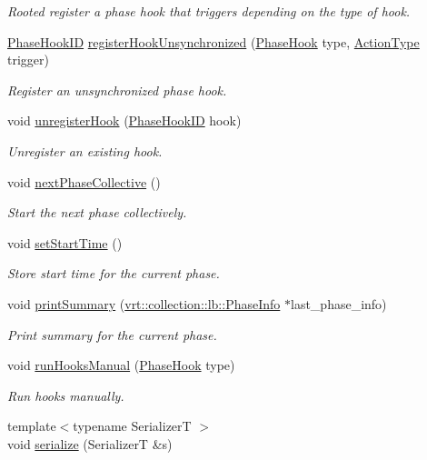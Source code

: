 \begin{DoxyCompactItemize}
\begin{DoxyCompactList}\small\item\em Rooted register a phase hook that triggers depending on the type of hook. \end{DoxyCompactList}\item 
\hyperlink{structvt_1_1phase_1_1_phase_hook_i_d}{Phase\+Hook\+ID} \hyperlink{structvt_1_1phase_1_1_phase_manager_a76cf36135d228374c5ce1f6da5ea10b1}{register\+Hook\+Unsynchronized} (\hyperlink{namespacevt_1_1phase_aec9a63fdd99680d7a7fe99d321193811}{Phase\+Hook} type, \hyperlink{namespacevt_ae0a5a7b18cc99d7b732cb4d44f46b0f3}{Action\+Type} trigger)
\begin{DoxyCompactList}\small\item\em Register an unsynchronized phase hook. \end{DoxyCompactList}\item 
void \hyperlink{structvt_1_1phase_1_1_phase_manager_a78334fd49c35f694f1e5fe5c560dc211}{unregister\+Hook} (\hyperlink{structvt_1_1phase_1_1_phase_hook_i_d}{Phase\+Hook\+ID} hook)
\begin{DoxyCompactList}\small\item\em Unregister an existing hook. \end{DoxyCompactList}\item 
void \hyperlink{structvt_1_1phase_1_1_phase_manager_ac94bfde4a103cbdec426542191c41092}{next\+Phase\+Collective} ()
\begin{DoxyCompactList}\small\item\em Start the next phase collectively. \end{DoxyCompactList}\item 
void \hyperlink{structvt_1_1phase_1_1_phase_manager_a7844c9468a45c9e49d94436f3f565a1f}{set\+Start\+Time} ()
\begin{DoxyCompactList}\small\item\em Store start time for the current phase. \end{DoxyCompactList}\item 
void \hyperlink{structvt_1_1phase_1_1_phase_manager_a789e81d0a1ae09f1aeac4e72fd884584}{print\+Summary} (\hyperlink{structvt_1_1vrt_1_1collection_1_1lb_1_1_phase_info}{vrt\+::collection\+::lb\+::\+Phase\+Info} $\ast$last\+\_\+phase\+\_\+info)
\begin{DoxyCompactList}\small\item\em Print summary for the current phase. \end{DoxyCompactList}\item 
void \hyperlink{structvt_1_1phase_1_1_phase_manager_ae436f95e5eb570b17c71a48d96675f69}{run\+Hooks\+Manual} (\hyperlink{namespacevt_1_1phase_aec9a63fdd99680d7a7fe99d321193811}{Phase\+Hook} type)
\begin{DoxyCompactList}\small\item\em Run hooks manually. \end{DoxyCompactList}\item 
{\footnotesize template$<$typename SerializerT $>$ }\\void \hyperlink{structvt_1_1phase_1_1_phase_manager_a9cc247a2194bc858fa043a5fe5c9fb76}{serialize} (SerializerT \&s)
\end{DoxyCompactItemize}
